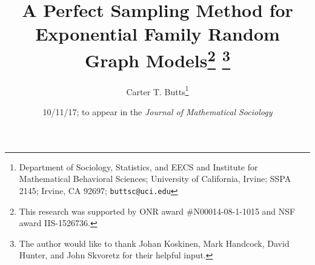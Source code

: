 \documentclass[11pt]{article}
\begin{document}
\title{A Perfect Sampling Method for Exponential Family Random Graph Models\thanks{This research was supported by ONR award \#N00014-08-1-1015 and NSF award IIS-1526736.} \thanks{The author would like to thank Johan Koskinen, Mark Handcock, David Hunter, and John Skvoretz for their helpful input.}
}

\author{
Carter T. Butts\thanks{Department of Sociology, Statistics, and EECS and Institute for Mathematical Behavioral Sciences; University of California, Irvine; SSPA 2145; Irvine, CA 92697; \texttt{buttsc@uci.edu}}
}




\date{10/11/17; to appear in the \emph{Journal of Mathematical Sociology}
}
\maketitle


\end{document}
